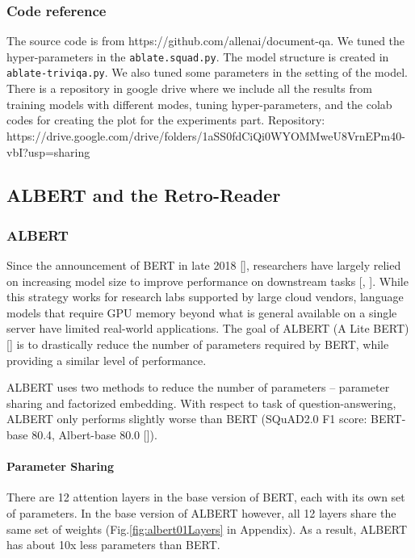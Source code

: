 \documentclass{article}
\begin{document}
\subsubsection{Code reference}
The source code is from https://github.com/allenai/document-qa. We tuned the hyper-parameters in the \verb|ablate.squad.py|. The model structure is created in \verb|ablate-triviqa.py|. We also tuned some parameters in the setting of the model. There is a repository in google drive where we include all the results from training models with different modes, tuning hyper-parameters, and the colab codes for creating the plot for the experiments part. Repository: https://drive.google.com/drive/folders/1aSS0fdCiQi0WYOMMweU8VrnEPm40-vbI?usp=sharing

\subsection{ALBERT and the Retro-Reader}

\subsubsection{ALBERT}
Since the announcement of BERT in late 2018 [], researchers have largely relied on increasing model size to improve performance on downstream tasks [, ].  While this strategy works for research labs supported by large cloud vendors, language models that require GPU memory beyond what is general available on a single server have limited real-world applications.  The goal of ALBERT (A Lite BERT) [] is to drastically reduce the number of parameters required by BERT, while providing a similar level of performance.

ALBERT uses two methods to reduce the number of parameters -- parameter sharing and factorized embedding.  With respect to task of question-answering, ALBERT only performs slightly worse than BERT (SQuAD2.0 F1 score:  BERT-base 80.4, Albert-base 80.0 []).

\paragraph{Parameter Sharing}
There are 12 attention layers in the base version of BERT, each with its own set of parameters.  In the base version of ALBERT however, all 12 layers share the same set of weights (Fig.\ref{fig:albert01Layers} in Appendix).  As a result, ALBERT has about 10x less parameters than BERT.
\end{document}
